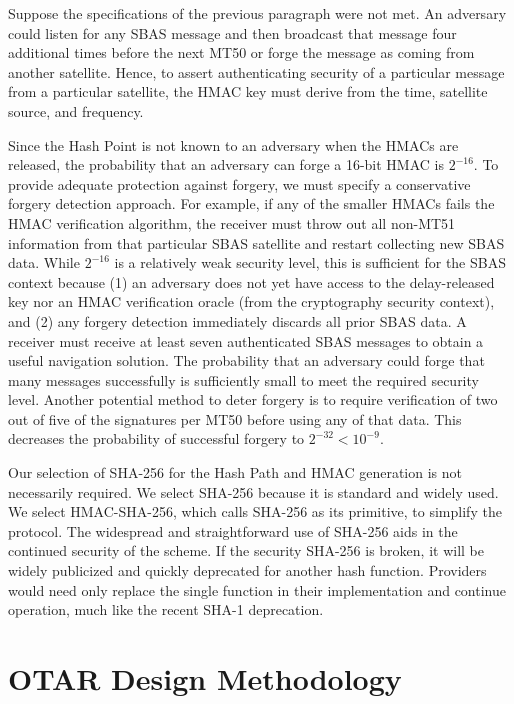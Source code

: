 \documentclass[APA,STIX1COL]{IONjournal/ION-APA Template}
\begin{document}
		Suppose the specifications of the previous paragraph were not met.
		An adversary could listen for any SBAS message and then broadcast that message four additional times before the next MT50 or forge the message as coming from another satellite.
		Hence, to assert authenticating security of a particular message from a particular satellite, the HMAC key must derive from the time, satellite source, and frequency.

		Since the Hash Point is not known to an adversary when the HMACs are released, the probability that an adversary can forge a 16-bit HMAC is $2^{-16}$.
		To provide adequate protection against forgery, we must specify a conservative forgery detection approach.
		For example, if any of the smaller HMACs fails the HMAC verification algorithm, the receiver must throw out all non-MT51 information from that particular SBAS satellite and restart collecting new SBAS data.
		While $2^{-16}$ is a relatively weak security level, this is sufficient for the SBAS context because (1) an adversary does not yet have access to the delay-released key nor an HMAC verification oracle (from the cryptography security context), and (2) any forgery detection immediately discards all prior SBAS data.
		A receiver must receive at least seven authenticated SBAS messages to obtain a useful navigation solution.
		The probability that an adversary could forge that many messages successfully is {}sufficiently small to meet the required security level.
		Another potential method to deter forgery is to require verification of two out of five of the signatures per MT50 before using any of that data.
		This decreases the probability of successful forgery to $2^{-32} < 10^{-9}$.		

		Our selection of SHA-256 for the Hash Path and HMAC generation is not necessarily required.
		We select SHA-256 because it is standard and widely used.
		We select HMAC-SHA-256, which calls SHA-256 as its primitive, to simplify the protocol.
		The widespread and straightforward use of SHA-256 aids in the continued security of the scheme.
		If the security SHA-256 is broken, it will be widely publicized and quickly deprecated for another hash function.
		Providers would need only replace the single function in their implementation and continue operation, much like the recent SHA-1 deprecation.

\section{OTAR Design Methodology} \label{sec:otar_design_methodology}
\end{document}
